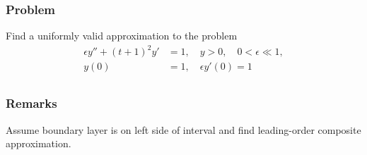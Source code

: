 \documentclass[12pt,twoside]{article}
\begin{document}
\subsubsection*{Problem}
Find a uniformly valid approximation to the problem
\begin{equation}
  \label{eq:3.4.3-problem}
  \begin{aligned}
    \epsilon y''+{(t+1)}^2y'&=1, \quad y>0,\quad 0<\epsilon\ll1,\\
    y(0)&=1, \quad \epsilon y'(0)=1 \\
  \end{aligned}
\end{equation}
\subsubsection*{Remarks}
Assume boundary layer is on left side of interval and find leading-order
composite approximation.
\end{document}
